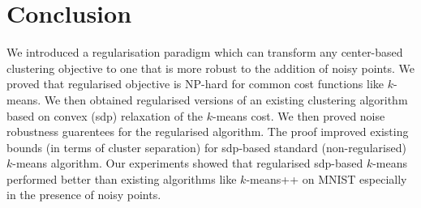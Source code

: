 \documentclass[12pt]{article}
\begin{document}
\section{Conclusion}
We introduced a regularisation paradigm which can transform any center-based clustering objective to one that is more robust to the addition of noisy points.  We proved that regularised objective is NP-hard for common cost functions like $k$-means. We then obtained regularised versions of an existing clustering algorithm based on convex (sdp) relaxation of the $k$-means cost. We then proved noise robustness guarentees for the regularised algorithm. The proof improved existing bounds (in terms of cluster separation) for sdp-based standard (non-regularised) $k$-means algorithm. Our experiments showed that regularised sdp-based $k$-means performed better than existing algorithms like $k$-means++ on MNIST especially in the presence of noisy points.

\ifdefined\COMPLETE
\else 
\end{document}
